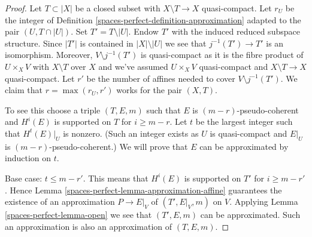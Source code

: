 \begin{proof}
Let $T \subset |X|$ be a closed subset with $X \setminus T \to X$
quasi-compact. Let $r_U$ be the integer of
Definition \ref{spaces-perfect-definition-approximation}
adapted to the pair $(U, T \cap |U|)$.
Set $T' = T \setminus |U|$. Endow $T'$ with the induced reduced
subspace structure. Since $|T'|$ is contained in $|X| \setminus |U|$
we see that $j^{-1}(T') \to T'$ is an isomorphism. Moreover,
$V \setminus j^{-1}(T')$ is quasi-compact as it is the fibre product
of $U \times_X V$ with $X \setminus T$ over $X$ and we've assumed
$U \times_X V$ quasi-compact and $X \setminus T \to X$ quasi-compact.
Let $r'$ be the number of affines needed to cover $V \setminus j^{-1}(T')$.
We claim that $r = \max(r_U, r')$ works for the pair $(X, T)$.

\medskip\noindent
To see this choose a triple $(T, E, m)$ such that $E$ is
$(m - r)$-pseudo-coherent and $H^i(E)$ is supported on $T$ for
$i \geq m - r$. Let $t$ be the largest integer such that
$H^t(E)|_U$ is nonzero. (Such an integer exists as $U$ is quasi-compact
and $E|_U$ is $(m - r)$-pseudo-coherent.)
We will prove that $E$ can be approximated by induction on $t$.

\medskip\noindent
Base case: $t \leq m - r'$. This means that $H^i(E)$ is supported
on $T'$ for $i \geq m - r'$. Hence
Lemma \ref{spaces-perfect-lemma-approximation-affine}
guarantees the existence of an approximation
$P \to E|_V$ of $(T', E|_V, m)$ on $V$.
Applying Lemma \ref{spaces-perfect-lemma-open} we see that
$(T', E, m)$ can be approximated. Such an approximation
is also an approximation of $(T, E, m)$.


\end{proof}
